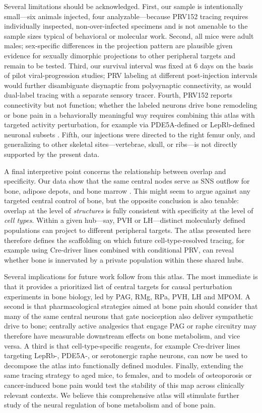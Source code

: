\documentclass[11pt]{article}
\begin{document}
Several limitations should be acknowledged. First, our sample is intentionally small---six animals injected, four analyzable---because PRV152 tracing requires individually inspected, non-over-infected specimens and is not amenable to the sample sizes typical of behavioral or molecular work. Second, all mice were adult males; sex-specific differences in the projection pattern are plausible given evidence for sexually dimorphic projections to other peripheral targets \citep{adler2012neurochemical} and remain to be tested. Third, our survival interval was fixed at 6 days on the basis of pilot viral-progression studies; PRV labeling at different post-injection intervals would further disambiguate disynaptic from polysynaptic connectivity, as would dual-label tracing with a separate sensory tracer. Fourth, PRV152 reports connectivity but not function; whether the labeled neurons drive bone remodeling or bone pain in a behaviorally meaningful way requires combining this atlas with targeted activity perturbation, for example via PDE5A-defined or LepRb-defined neuronal subsets \citep{kim2020pde5a,flak2016cns}. Fifth, our injections were directed to the right femur only, and generalizing to other skeletal sites---vertebrae, skull, or ribs---is not directly supported by the present data.

A final interpretive point concerns the relationship between overlap and specificity. Our data show that the same central nodes serve as SNS outflow for bone, adipose depots, and bone marrow \citep{bartness2014neural,ryu2014short,kim2020pde5a}. This might seem to argue against any targeted central control of bone, but the opposite conclusion is also tenable: overlap at the level of \emph{structures} is fully consistent with specificity at the level of \emph{cell types}. Within a given hub---say, PVH or LH---distinct molecularly defined populations can project to different peripheral targets. The atlas presented here therefore defines the scaffolding on which future cell-type-resolved tracing, for example using Cre-driver lines combined with conditional PRV, can reveal whether bone is innervated by a private population within these shared hubs.

Several implications for future work follow from this atlas. The most immediate is that it provides a prioritized list of central targets for causal perturbation experiments in bone biology, led by PAG, RMg, RPa, PVH, LH and MPOM. A second is that pharmacological strategies aimed at bone pain should consider that many of the same central neurons that gate nociception also deliver sympathetic drive to bone; centrally active analgesics that engage PAG or raphe circuitry may therefore have measurable downstream effects on bone metabolism, and vice versa. A third is that cell-type-specific reagents, for example Cre-driver lines targeting LepRb-, PDE5A-, or serotonergic raphe neurons, can now be used to decompose the atlas into functionally defined modules. Finally, extending the same tracing strategy to aged mice, to females, and to models of osteoporosis or cancer-induced bone pain would test the stability of this map across clinically relevant contexts. We believe this comprehensive atlas will stimulate further study of the neural regulation of bone metabolism and of bone pain.



\end{document}
